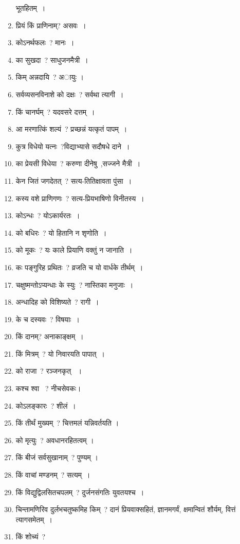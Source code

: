 \documentclass[twoside,12pt,notitlepage]{book}
\begin{document}
\begin{enumerate}
	भूतहितम्~।\footB\
	\item प्रियं किं प्राणिनाम्? 
	असवः~।\footB\
	\item कोऽनर्थफलः~? 
	मानः~।\footB\
	\item का सुखदा~? 
	साधुजनमैत्री~।\footB\
	\item किम् अन्नदायि~? अायुः ।
	\item सर्वव्यसनविनाशे को दक्षः~? 
	सर्वथा त्यागी~।\footB\
	\item किं चानर्घम्~? 
	यदवसरे दत्तम्~।\footB\
	\item आ मरणात्किं शल्यं~? प्रच्छन्नं यत्कृतं पापम्~।
	\item कुत्र विधेयो यत्नः~?विद्याभ्यासे सदौषधे दाने~।
	\item का प्रेयसी विधेया~? करुणा दीनेषु~,सज्जने मैत्री~।
	\item केन जितं जगदेतत्~? 
	सत्य-तितिक्षावता पुंसा~।\footB\ 
	\item कस्य वशे प्राणिगणः~? सत्य-प्रियभाषिणो विनीतस्य~।
	\item कोऽन्धः~? 
	योऽकार्यरतः~।\footB\
	\item को बधिरः~? यो हितानि न शृणोति~।
	\item को मूकः~? यः काले प्रियाणि वक्तुं न जानाति~।
	\item कः पङ्गुरिह  प्रथितः~? 
	व्रजति च यो वार्धके तीर्थम्~।\footB\
	\item चक्षुष्मन्तोऽप्यन्धाः के स्युः~? नास्तिका मनुजाः~।
	\item अन्धादिह को विशिष्यते~? 
	रागी~।\footB\
	\item के च दस्यवः~? विषयाः~।\footB\
	\item किं दानम्? 
	अनाकाङ्क्षम्~।\footB\
	\item किं मित्रम्~? यो निवारयति पापात्~।
	\item को राजा~? रञ्जनकृत् ~।
	\item कश्च श्वा ~? 
	नीचसेवकः।\footB\
	\item कोऽलङ्कारः~? शीलं~।
	\item किं तीर्थं मुख्यम्~? चित्तमलं यन्निवर्तयति ।
	\item को मृत्युः~? अवधानरहितत्वम् ।
	\item किं बीजं सर्वसुखानाम्~? पुण्यम् ।
	\item किं वाचां मण्डनम्~? सत्यम्~।
	\item किं विद्युद्विलसितचपलम्~? दुर्जनसंगतिः युवतयश्च~।
	\item चिन्तामणिरिव दुर्लभचतुष्कमिह किम्~? दानं प्रियवाक्सहितं, ज्ञानमगर्वं, क्षमान्वितं शौर्यम्, वित्तं त्यागसमेतम्~।
	\item किं शोच्यं~? 

\end{enumerate}
\end{document}
